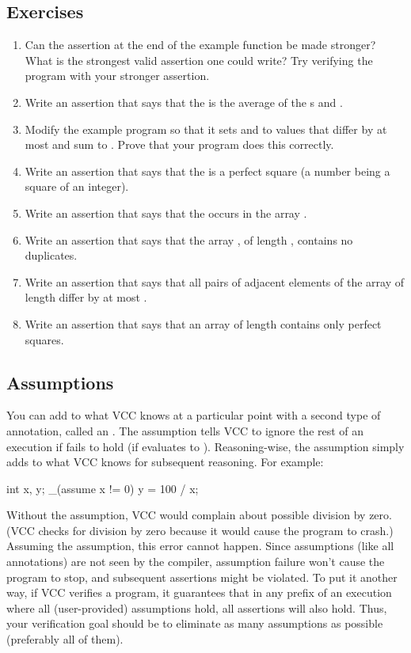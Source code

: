 \subsection*{Exercises}
\begin{enumerate}
\item Can the assertion at the end of the example function be made
  stronger? What is the strongest valid assertion one could write? Try 
  verifying the program with your stronger assertion.
\item Write an assertion that says that the   is the average of
  the s  and .
\item Modify the example program so that it sets  and  to values
that differ by at most  and sum to . Prove that your program 
does this correctly.
\item Write an assertion that says that the   is a
  perfect square (\ie a number being a square of an integer).
\item Write an assertion that says that the   occurs
  in the  array .
\item Write an assertion that says that the  array ,
  of length , contains no duplicates.
\item Write an assertion that says that all pairs of adjacent elements
  of the  array  of length  differ by at most
  .
\item Write an assertion that says that an array  of length
   contains only perfect squares.
\end{enumerate}

\subsection{Assumptions}

You can add to what VCC knows at a particular point with a second
type of annotation, called an .
The assumption  tells VCC to ignore
the rest of an execution if  fails to hold (\ie if
 evaluates to ). 
Reasoning-wise, the assumption simply adds  to what VCC
knows for subsequent reasoning. For example:
\begin{VCC}
int x, y;
_(assume x != 0)
y = 100 / x;
\end{VCC}
Without the assumption, VCC would complain about possible division by
zero. (VCC checks for division by zero because it would cause the
program to crash.)  Assuming the assumption, this error cannot happen.  
Since assumptions (like all annotations) are not seen by the compiler,
assumption failure won't cause the program to stop, and subsequent assertions
might be violated. To put it another way, if VCC verifies a program,
it guarantees that in any prefix of an execution
where all (user-provided) assumptions hold, all assertions will also
hold. Thus, your verification goal should be to eliminate as many assumptions as
possible (preferably all of them).

